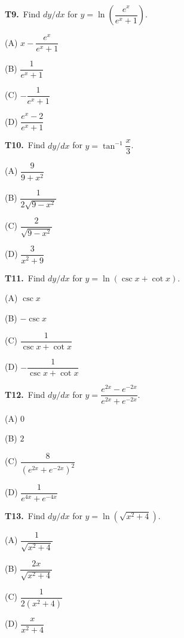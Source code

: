 \documentclass[11pt]{article}
\begin{document}
\bigskip\noindent\textbf{T9.}\ Find $dy/dx$ for $y = \ln\!\left(\dfrac{e^x}{e^x+1}\right)$.
\begin{list}{}{\setlength{\leftmargin}{3em}\setlength{\labelwidth}{2.5em}\setlength{\itemsep}{0pt}\setlength{\topsep}{2pt}}
\item[(A)] $x - \dfrac{e^x}{e^x+1}$
\item[(B)] $\dfrac{1}{e^x+1}$
\item[(C)] $-\dfrac{1}{e^x+1}$
\item[(D)] $\dfrac{e^x-2}{e^x+1}$
\end{list}

\bigskip\noindent\textbf{T10.}\ Find $dy/dx$ for $y = \tan^{-1}\dfrac{x}{3}$.
\begin{list}{}{\setlength{\leftmargin}{3em}\setlength{\labelwidth}{2.5em}\setlength{\itemsep}{0pt}\setlength{\topsep}{2pt}}
\item[(A)] $\dfrac{9}{9+x^2}$
\item[(B)] $\dfrac{1}{2\sqrt{9-x^2}}$
\item[(C)] $\dfrac{2}{\sqrt{9-x^2}}$
\item[(D)] $\dfrac{3}{x^2+9}$
\end{list}

\bigskip\noindent\textbf{T11.}\ Find $dy/dx$ for $y = \ln(\csc x + \cot x)$.
\begin{list}{}{\setlength{\leftmargin}{3em}\setlength{\labelwidth}{2.5em}\setlength{\itemsep}{0pt}\setlength{\topsep}{2pt}}
\item[(A)] $\csc x$
\item[(B)] $-\csc x$
\item[(C)] $\dfrac{1}{\csc x + \cot x}$
\item[(D)] $-\dfrac{1}{\csc x + \cot x}$
\end{list}

\bigskip\noindent\textbf{T12.}\ Find $dy/dx$ for $y = \dfrac{e^{2x}-e^{-2x}}{e^{2x}+e^{-2x}}$.
\begin{list}{}{\setlength{\leftmargin}{3em}\setlength{\labelwidth}{2.5em}\setlength{\itemsep}{0pt}\setlength{\topsep}{2pt}}
\item[(A)] $0$
\item[(B)] $2$
\item[(C)] $\dfrac{8}{(e^{2x}+e^{-2x})^2}$
\item[(D)] $\dfrac{1}{e^{4x}+e^{-4x}}$
\end{list}

\bigskip\noindent\textbf{T13.}\ Find $dy/dx$ for $y = \ln\!\left(\sqrt{x^2+4}\right)$.
\begin{list}{}{\setlength{\leftmargin}{3em}\setlength{\labelwidth}{2.5em}\setlength{\itemsep}{0pt}\setlength{\topsep}{2pt}}
\item[(A)] $\dfrac{1}{\sqrt{x^2+4}}$
\item[(B)] $\dfrac{2x}{\sqrt{x^2+4}}$
\item[(C)] $\dfrac{1}{2(x^2+4)}$
\item[(D)] $\dfrac{x}{x^2+4}$
\end{list}
\end{document}
